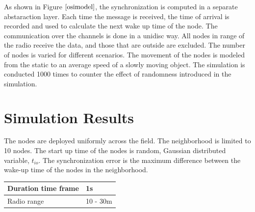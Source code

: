 \documentclass[a4paper,10pt]{report}
\begin{document}
As shown in Figure $\ref{osimodel}$, the synchronization is computed in a separate abstaraction layer. Each time the message is received, the time of arrival is recorded and used to calculate the next wake up time of the node. The communication over the channels is done in a unidisc way. All nodes in range of the radio receive the data, and those that are outside are excluded. 
\newline
The number of nodes is varied for different scenarios. The movement of the nodes is modeled from the static to an average speed of a slowly moving object. The simulation is conducted 1000 times to counter the effect of randomness introduced in the simulation.
\section{\textbf{Simulation Results}}
The nodes are deployed uniformly across the field. The neighborhood is limited to 10 nodes. The start up time of the nodes is random, Gaussian distributed variable, $t_{io}$. The synchronization error is the maximum difference between the wake-up time of the nodes in the neighborhood.
\newline
\begin{center}
    \begin{tabular}{ | l | l |}
    \hline
    Duration time frame & 1s \\ \hline
    Radio range & 10 - 30m \\ \hline
    \end{tabular}
\end{center}
\end{document}
